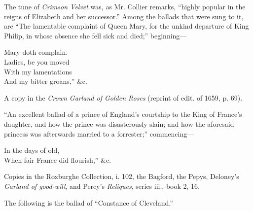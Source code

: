 The tune of \textit{Crimson Velvet} was, as Mr. Collier remarks, “highly popular in
the reigns of Elizabeth and her successor.” Among the ballads that were sung
to it, are “The lamentable complaint of Queen Mary, for the unkind departure of
King Philip, in whose absence she fell sick and died;” beginning—
\settowidth{\versewidth}{Mary doth complain.}
\begin{scverse}Mary doth complain.\\
Ladies, be you moved\\
With my lamentations\\
And my bitter groans,” \&c.
\end{scverse}
A copy in the \textit{Crown Garland of Golden Roses} (reprint of edit. of 1659, p. 69).

“An excellent ballad of a prince of \pagebreak England’s courtship to the King of
France’s daughter, and how the prince was disasterously slain; and how the
aforesaid princess was afterwards married to a forrester;” commencing—
\settowidth{\versewidth}{When fair France did flourish,”}
\begin{scverse}
In the days of old,\\
When fair France did flourish,” \&c.
\end{scverse}
Copies in the Roxburghe Collection, i. 102, the Bagford, the Pepys, Deloney’s
\textit{Garland of good-will}, and Percy’s \textit{Reliques}, series iii., book 2, 16.

The following is the ballad of “Constance of Cleveland.”



\pagebreak

